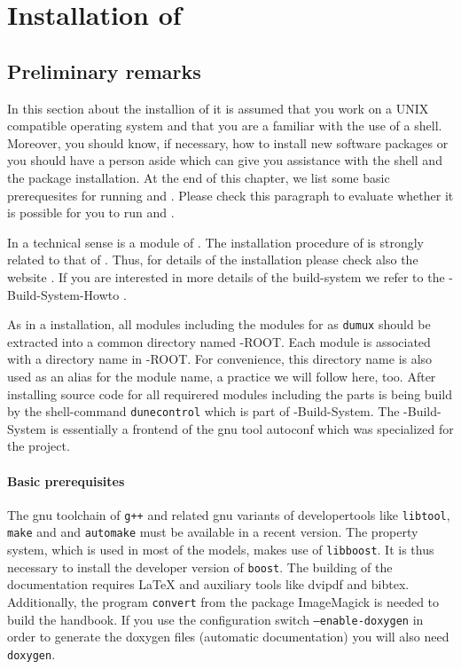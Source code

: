 \section{Installation of \Dumux} \label{install}
\subsection{Preliminary remarks}

In this section about the installion of \Dumux it is assumed that you work on a UNIX compatible operating system and that you are a familiar with the use of a shell. Moreover, you should know,  if necessary, how to install
new software packages or you should have a person aside which can give you assistance with the shell and
the package installation. At the end of this chapter, we list some basic prerequesites for running \Dune and \Dumux. Please check this paragraph to evaluate whether it is possible for you to run \Dune and \Dumux.

In a technical sense \Dumux is a module of \Dune. The installation procedure of \Dumux is strongly related to 
that of \Dune.  Thus, for details of the installation please check also the {\Dune} website \cite{DUNE-HP}. If you are interested in more details of the build-system we refer to the {\Dune}-Build-System-Howto \cite{DUNE-HP}.

As in a \Dune installation, all \Dune modules including the modules for \Dumux as \texttt{dumux} should be extracted into a common directory named {\Dune}-ROOT. Each \Dune module is associated with a directory name in {\Dune}-ROOT. For convenience, this directory name is  also used as an alias for the module name, a practice we will follow here, too.
After installing source code for all requirered \Dune modules including the \Dumux parts
\Dune is being build by the shell-command \texttt{dunecontrol} which is part of {\Dune}-Build-System. The {\Dune}-Build-System is essentially a frontend of the gnu tool autoconf which was specialized for the \Dune project.

\paragraph{Basic prerequisites} \label{prerequisites}
The gnu toolchain of \texttt{g++}  and related gnu variants of developertools like \texttt{libtool}, \texttt{make} and
and \texttt{automake} must be available in a recent version. The \Dumux property system, which is used in most of the models, makes use of \texttt{libboost}. It is thus necessary to install the developer version of \texttt{boost}.
The building of the documentation requires LaTeX and auxiliary tools like dvipdf and bibtex. Additionally, the program \texttt{convert} from the package ImageMagick is needed to build the handbook.  If you use the configuration switch \texttt{--enable-doxygen} in order to generate the doxygen files (automatic documentation) you will also need \texttt{doxygen}.

